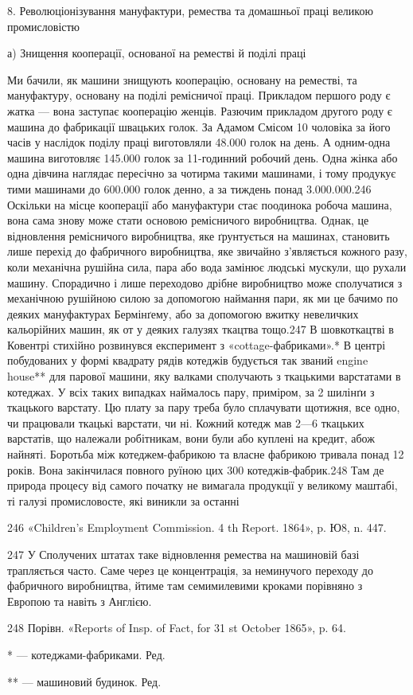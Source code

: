 8. Революціонізування мануфактури, ремества та домашньої
праці великою промисловістю

а) Знищення кооперації, основаної
на реместві й поділі праці

Ми бачили, як машини знищують кооперацію, основану на
реместві, та мануфактуру, основану на поділі ремісничої
праці. Прикладом першого роду є жатка — вона заступає кооперацію
женців. Разючим прикладом другого роду є машина до
фабрикації швацьких голок. За Адамом Смісом 10 чоловіка за
його часів у наслідок поділу праці виготовляли 48.000 голок на
день. А одним-одна машина виготовляє 145.000 голок за 11-годинний
робочий день. Одна жінка або одна дівчина наглядає
пересічно за чотирма такими машинами, і тому продукує тими
машинами до 600.000 голок денно, а за тиждень понад 3.000.000.246
Оскільки на місце кооперації або мануфактури стає поодинока
робоча машина, вона сама знову може стати основою ремісничого
виробництва. Однак, це відновлення ремісничого виробництва,
яке ґрунтується на машинах, становить лише перехід до фабричного
виробництва, яке звичайно з’являється кожного разу, коли
механічна рушійна сила, пара або вода замінює людські мускули,
що рухали машину. Спорадично і лише переходово дрібне виробництво
може сполучатися з механічною рушійною силою за
допомогою наймання пари, як ми це бачимо по деяких мануфактурах
Бермінґему, або за допомогою вжитку невеличких кальорійних
машин, як от у деяких галузях ткацтва тощо.247 В шовкоткацтві
в Ковентрі стихійно розвинувся експеримент з «cottage-фабриками».*
В центрі побудованих у формі квадрату рядів котеджів
будується так званий engine house** для парової машини,
яку валками сполучають з ткацькими варстатами в котеджах.
У всіх таких випадках наймалось пару, приміром, за 2 шилінґи
з ткацького варстату. Цю плату за пару треба було сплачувати
щотижня, все одно, чи працювали ткацькі варстати, чи ні. Кожний
котедж мав 2—6 ткацьких варстатів, що належали робітникам,
вони були або куплені на кредит, абож найняті. Боротьба між
котеджем-фабрикою та власне фабрикою тривала понад 12 років.
Вона закінчилася повного руїною цих 300 котеджів-фабрик.248 Там
де природа процесу від самого початку не вимагала продукції у великому
маштабі, ті галузі промисловосте, які виникли за останні

246 «Children’s Employment Commission. 4 th Report. 1864», p. Ю8,
n. 447.

247    У Сполучених штатах таке відновлення ремества на машиновій
базі трапляється часто. Саме через це концентрація, за неминучого переходу
до фабричного виробництва, йтиме там семимилевими кроками порівняно
з Европою та навіть з Англією.

248    Порівн. «Reports of Insp. of Fact, for 31 st October 1865», p. 64.

* — котеджами-фабриками. Ред.

** — машиновий будинок. Ред.
